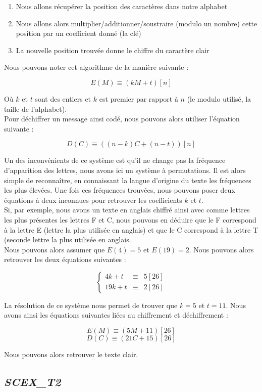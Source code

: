 \begin{enumerate}
 \item Nous allons récupérer la position des caractères dans notre alphabet
 \item Nous allons alors multiplier/additionner/soustraire (modulo un nombre) cette position par un coefficient donné (la clé)
 \item La nouvelle position trouvée donne le chiffre du caractère clair
\end{enumerate}
Nous pouvons noter cet algorithme de la manière suivante :
\begin{center}
    \begin{equation}
	E(M)\equiv (kM+t)[n]
    \end{equation}
\end{center}
Où $k$ et $t$ sont des entiers et $k$ est premier par rapport à $n$ (le modulo utilisé, la taille de l'alphabet).\\
Pour déchiffrer un message ainsi codé, nous pouvons alors utiliser l'équation suivante :
\begin{center}
    \begin{equation}
	D(C)\equiv ((n-k)C+(n-t))[n]
    \end{equation}
\end{center}
Un des inconvénients de ce système est qu'il ne change pas la fréquence d'apparition des lettres, nous avons ici un système à permutations. Il est alors simple de reconnaître, en connaissant la langue d'origine du texte les fréquences les plus élevées. Une fois ces fréquences trouvées, nous pouvons poser deux équations à deux inconnues pour retrouver les coefficients $k$ et $t$.\\
Si, par exemple, nous avons un texte en anglais chiffré ainsi avec comme lettres les plus présentes les lettres F et C, nous pouvons en déduire que le F correspond à la lettre E (lettre la plus utilisée en anglais) et que le C correspond à la lettre T (seconde lettre la plus utilisée en anglais.\\
Nous pouvons alors assumer que $E(4)=5$ et $E(19)=2$. Nous pouvons alors retrouver les deux équations suivantes :
\begin{center}
    \begin{equation}
	\left\{
	\begin{array}{lll}
	    4k+t & \equiv & 5[26] \\
	    19k+t & \equiv & 2[26]
	\end{array}
	\right.
    \end{equation}
\end{center}
La résolution de ce système nous permet de trouver que $k=5$ et $t=11$. Nous avons ainsi les équations suivantes liées au chiffrement et déchiffrement :
\begin{center}
    \begin{equation}
	E(M)\equiv (5M+11)[26]
    \end{equation}
    \begin{equation}
	D(C)\equiv (21C+15)[26]
    \end{equation}
\end{center}
Nous pouvons alors retrouver le texte clair.
\subsection{\textit{SCEX\_T2}}